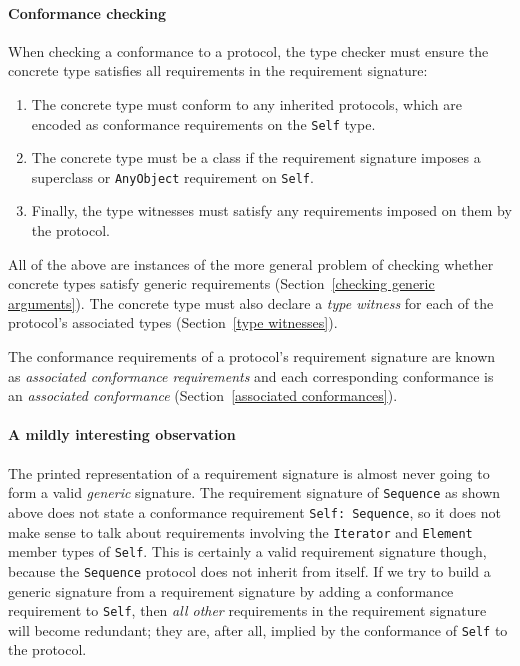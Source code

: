 \documentclass[a4paper,headsepline,bibliography=totoc,toc=flat,fleqn,twoside=semi]{scrbook}
\theoremstyle{definition}
\theoremstyle{definition}
\theoremstyle{definition}
\begin{document}
\paragraph{Conformance checking}
When checking a conformance to a protocol, the type checker must ensure the concrete type satisfies all requirements in the requirement signature:
\begin{enumerate}
\item The concrete type must conform to any inherited protocols, which are encoded as conformance requirements on the \texttt{Self} type.
\item The concrete type must be a class if the requirement signature imposes a superclass or \texttt{AnyObject} requirement on \texttt{Self}.
\item Finally, the type witnesses must satisfy any requirements imposed on them by the protocol.
\end{enumerate}
All of the above are instances of the more general problem of checking whether concrete types satisfy generic requirements (Section~\ref{checking generic arguments}). The concrete type must also declare a \emph{type witness} for each of the protocol's associated types (Section~\ref{type witnesses}).

The conformance requirements of a protocol's requirement signature are known as \emph{associated conformance requirements} and each corresponding conformance is an \emph{associated conformance} (Section~\ref{associated conformances}).

\paragraph{A mildly interesting observation} The printed representation of a requirement signature is almost never going to form a valid \emph{generic} signature. The requirement signature of \texttt{Sequence} as shown above does not state a conformance requirement \texttt{Self:\ Sequence}, so it does not make sense to talk about requirements involving the \texttt{Iterator} and \texttt{Element} member types of \texttt{Self}. This is certainly a valid requirement signature though, because the \texttt{Sequence} protocol does not inherit from itself. If we try to build a generic signature from a requirement signature by adding a conformance requirement to \texttt{Self}, then \emph{all other} requirements in the requirement signature will become redundant; they are, after all, implied by the conformance of \texttt{Self} to the protocol.
\end{document}
